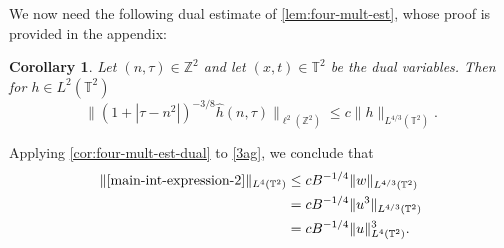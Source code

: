 \documentclass[12pt,reqno]{amsart}
\newcommand{\wh}{\widehat}
\newcommand{\zz}{\mathbb{Z}}
\newcommand{\ci}{\mathbb{T}}
\theoremstyle{plain}  %
\newtheorem{corollary}{Corollary}
\begin{document}
%
%
We now need the following dual estimate of 
\autoref{lem:four-mult-est}, whose proof is provided in the appendix:
%
%
\begin{corollary}
	\label{cor:four-mult-est-dual}
Let $(n, \tau) \in \zz^2$ and let  $(x, t) \in \ci^2$
be the dual variables. Then for $h \in L^2(\ci^2)$
%
%
\begin{equation}
	\label{four-mult-est-dual}
	\|(1 + |\tau - 
	n^2|)^{-3/8} \wh{h}(n, \tau) \|_{\ell^2(\zz^2)} \le 
	c \|h\|_{L^{4/3}(\ci^2)}.
\end{equation}
%
%
\end{corollary}
Applying \autoref{cor:four-mult-est-dual} to \eqref{3ag}, we conclude that 
%
%
\begin{equation}
	\label{main-int-est-2}
	\begin{split}
		\|\eqref{main-int-expression-2}\|_{L^4(\ci^2)} 
		& \le c B^{-1/4} \|w\|_{L^{4/3}(\ci^2)}
		\\
		& = c B^{-1/4} \|u^3\|_{L^{4/3}(\ci^2)}
		\\
		& = c B^{-1/4} \|u\|^3_{L^4(\ci^2)}.
	\end{split}
\end{equation}
\end{document}
